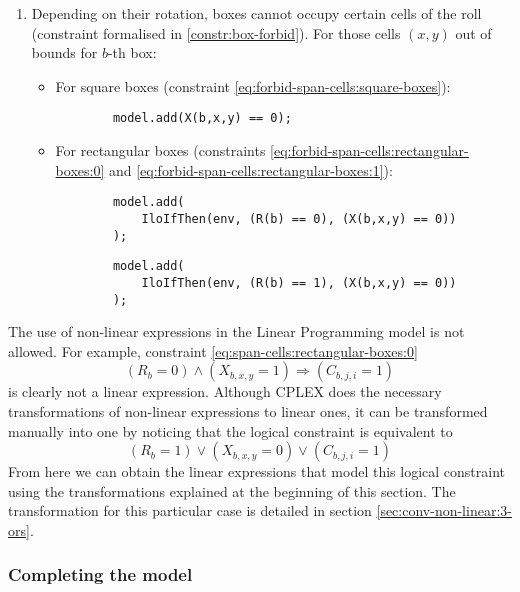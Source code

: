 \begin{enumerate}
	\item Depending on their rotation, boxes cannot occupy certain cells of the
	roll (constraint formalised in \ref{constr:box-forbid}). For those cells $(x,y)$
	out of bounds for $b$-th box:
    
	\begin{itemize}
		\item For square boxes (constraint \ref{eq:forbid-span-cells:square-boxes}):
		{\NOINDENT \begin{lstlisting}
		model.add(X(b,x,y) == 0);
		\end{lstlisting}}
		
		\item For rectangular boxes (constraints \ref{eq:forbid-span-cells:rectangular-boxes:0}
		and \ref{eq:forbid-span-cells:rectangular-boxes:1}):
		{\NOINDENT \begin{lstlisting}
		model.add(
			IloIfThen(env, (R(b) == 0), (X(b,x,y) == 0))
		);
		\end{lstlisting}}
		{\NOINDENT \begin{lstlisting}
		model.add(
			IloIfThen(env, (R(b) == 1), (X(b,x,y) == 0))
		);
		\end{lstlisting}}
	\end{itemize}
    
\end{enumerate}

The use of non-linear expressions in the Linear Programming model is not allowed. For example,
constraint \ref{eq:span-cells:rectangular-boxes:0}
\[
(R_b = 0) \wedge (X_{b,x,y} = 1) \Longrightarrow (C_{b,j,i} = 1)
\]
is clearly not a linear expression. Although CPLEX does the necessary transformations
of non-linear expressions to linear ones, it can be transformed manually into one by noticing
that the logical constraint is equivalent to
\[
(R_b = 1) \vee (X_{b,x,y} = 0) \vee (C_{b,j,i} = 1)
\]
From here we can obtain the linear expressions that model this logical constraint using
the transformations explained at the beginning of this section.
The transformation for this particular case is detailed in section
\ref{sec:conv-non-linear:3-ors}.

\subsubsection{Completing the model}
\label{sec:linear-programming:implementation:completion}

